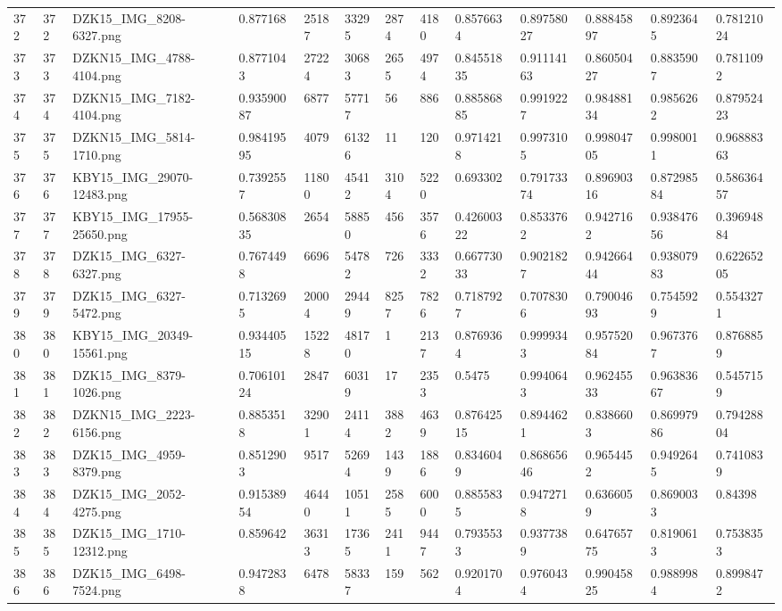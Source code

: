 \documentclass[11pt, a4paper, twoside]{report}
\begin{document}
\begin{longtable}[c]{@{}lllllllllllll@{}}
372 & 372 & DZK15\_IMG\_8208-6327.png & 0.877168 & 25187 & 33295 & 2874 & 4180 & 0.8576634 & 0.89758027 & 0.88845897 & 0.8923645 & 0.78121024 \\
373 & 373 & DZKN15\_IMG\_4788-4104.png & 0.8771043 & 27224 & 30683 & 2655 & 4974 & 0.84551835 & 0.91114163 & 0.86050427 & 0.8835907 & 0.7811092 \\
374 & 374 & DZKN15\_IMG\_7182-4104.png & 0.93590087 & 6877 & 57717 & 56 & 886 & 0.88586885 & 0.9919227 & 0.98488134 & 0.9856262 & 0.87952423 \\
375 & 375 & DZKN15\_IMG\_5814-1710.png & 0.98419595 & 4079 & 61326 & 11 & 120 & 0.9714218 & 0.9973105 & 0.99804705 & 0.9980011 & 0.96888363 \\
376 & 376 & KBY15\_IMG\_29070-12483.png & 0.7392557 & 11800 & 45412 & 3104 & 5220 & 0.693302 & 0.79173374 & 0.89690316 & 0.87298584 & 0.58636457 \\
377 & 377 & KBY15\_IMG\_17955-25650.png & 0.56830835 & 2654 & 58850 & 456 & 3576 & 0.42600322 & 0.8533762 & 0.9427162 & 0.93847656 & 0.39694884 \\
378 & 378 & DZK15\_IMG\_6327-6327.png & 0.7674498 & 6696 & 54782 & 726 & 3332 & 0.66773033 & 0.9021827 & 0.94266444 & 0.93807983 & 0.62265205 \\
379 & 379 & DZK15\_IMG\_6327-5472.png & 0.7132695 & 20004 & 29449 & 8257 & 7826 & 0.7187927 & 0.7078306 & 0.79004693 & 0.7545929 & 0.5543271 \\
380 & 380 & KBY15\_IMG\_20349-15561.png & 0.93440515 & 15228 & 48170 & 1 & 2137 & 0.8769364 & 0.9999343 & 0.95752084 & 0.9673767 & 0.8768859 \\
381 & 381 & DZK15\_IMG\_8379-1026.png & 0.70610124 & 2847 & 60319 & 17 & 2353 & 0.5475 & 0.9940643 & 0.96245533 & 0.96383667 & 0.5457159 \\
382 & 382 & DZKN15\_IMG\_2223-6156.png & 0.8853518 & 32901 & 24114 & 3882 & 4639 & 0.87642515 & 0.8944621 & 0.8386603 & 0.86997986 & 0.79428804 \\
383 & 383 & DZK15\_IMG\_4959-8379.png & 0.8512903 & 9517 & 52694 & 1439 & 1886 & 0.8346049 & 0.86865646 & 0.9654452 & 0.9492645 & 0.7410839 \\
384 & 384 & DZK15\_IMG\_2052-4275.png & 0.91538954 & 46440 & 10511 & 2585 & 6000 & 0.8855835 & 0.9472718 & 0.6366059 & 0.8690033 & 0.84398 \\
385 & 385 & DZK15\_IMG\_1710-12312.png & 0.859642 & 36313 & 17365 & 2411 & 9447 & 0.7935533 & 0.9377389 & 0.64765775 & 0.8190613 & 0.7538353 \\
386 & 386 & DZK15\_IMG\_6498-7524.png & 0.9472838 & 6478 & 58337 & 159 & 562 & 0.9201704 & 0.9760434 & 0.99045825 & 0.9889984 & 0.8998472 \\

\end{longtable}
\end{document}
